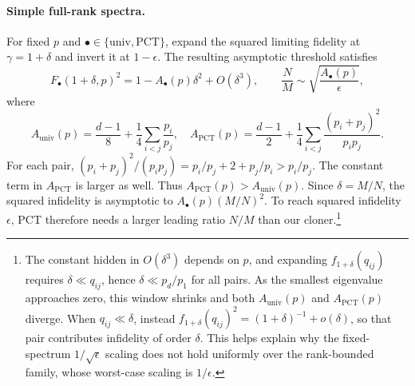 \documentclass[11pt]{article}
\theoremstyle{remark}
\theoremstyle{plain}
\begin{document}
\paragraph{Simple full-rank spectra.}
For fixed \(p\) and \(\bullet\in\{\mathrm{univ},\mathrm{PCT}\}\), expand
the squared limiting fidelity at \(\gamma=1+\delta\) and invert it at
\(1-\epsilon\).  The resulting asymptotic threshold satisfies
\begin{equation}\label{eq:full-rank-small-error}
  F_\bullet(1+\delta,p)^2
  =1-A_\bullet(p)\delta^2+O(\delta^3),
  \qquad
  \frac{N}{M}\sim\sqrt{\frac{A_\bullet(p)}{\epsilon}},
\end{equation}
where
\begin{equation}
  A_{\mathrm{univ}}(p)
  =\frac{d-1}{8}+\frac14\sum_{i<j}\frac{p_i}{p_j},\quad
  A_{\mathrm{PCT}}(p)
  =\frac{d-1}{2}+\frac14\sum_{i<j}\frac{(p_i+p_j)^2}{p_ip_j}.
\end{equation}
For each pair, \((p_i+p_j)^2/(p_ip_j)=p_i/p_j+2+p_j/p_i>p_i/p_j\).
The constant term in \(A_{\mathrm{PCT}}\) is larger as well.  Thus
\(A_{\mathrm{PCT}}(p)>A_{\mathrm{univ}}(p)\).  Since \(\delta=M/N\), the
squared infidelity is asymptotic to
\(A_\bullet(p)(M/N)^2\).  To reach squared infidelity \(\epsilon\), PCT
therefore needs a larger leading ratio \(N/M\) than our cloner.\footnote{The
constant hidden in \(O(\delta^3)\) depends on \(p\), and expanding
\(f_{1+\delta}(q_{ij})\) requires \(\delta\ll q_{ij}\), hence
\(\delta\ll p_d/p_1\) for all pairs.  As the smallest eigenvalue approaches
zero, this window shrinks and both \(A_{\mathrm{univ}}(p)\) and
\(A_{\mathrm{PCT}}(p)\) diverge.  When \(q_{ij}\ll\delta\), instead
\(f_{1+\delta}(q_{ij})^2=(1+\delta)^{-1}+o(\delta)\), so that pair
contributes infidelity of order \(\delta\).  This helps explain why the
fixed-spectrum \(1/\sqrt\epsilon\) scaling does not hold uniformly over
the rank-bounded family, whose worst-case scaling is \(1/\epsilon\).}
\end{document}

